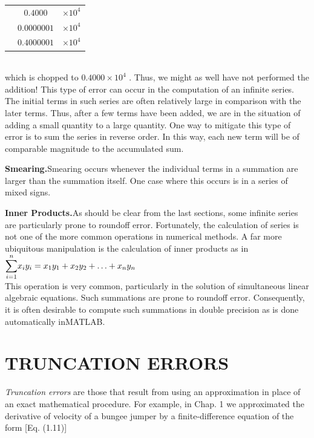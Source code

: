 \documentclass[../main.tex]{subfiles}
\begin{document}
\begin{tabular}{c c c}
    & $0.4000$ & $ \times 10^4$\\
    & $0.0000001$ & $ \times 10^4$\\
    \hline
    & $0.4000001$ & $ \times 10^4$\\
\end{tabular}\\

\noindent
which is chopped to $0.4000 \times 10^4$ . Thus, we might as well have not performed the addition!
This type of error can occur in the computation of an infinite series. The initial terms
in such series are often relatively large in comparison with the later terms. Thus, after a few
terms have been added, we are in the situation of adding a small quantity to a large quantity.
One way to mitigate this type of error is to sum the series in reverse order. In this way,
each new term will be of comparable magnitude to the accumulated sum.\\
\bigskip

\noindent
\textbf{Smearing.}\quad Smearing occurs whenever the individual terms in a summation are larger
than the summation itself. One case where this occurs is in a series of mixed signs.\\
\bigskip

\noindent
\textbf{Inner Products.}\quad As should be clear from the last sections, some infinite series are particularly
prone to roundoff error. Fortunately, the calculation of series is not one of the more
common operations in numerical methods. A far more ubiquitous manipulation is the calculation
of inner products as in\\

$\mathlarger{\sum}_{i=1}^{n}x_i y_i = x_1 y_1 + x_2 y_2 + \hdots + x_n y_n$\\

\noindent
This operation is very common, particularly in the solution of simultaneous linear algebraic
equations. Such summations are prone to roundoff error. Consequently, it is often desirable to
compute such summations in double precision as is done automatically inMATLAB.\\
\bigskip

\section[TRUNCATION ERRORS]{TRUNCATION ERRORS}
\noindent
\emph{Truncation errors} are those that result from using an approximation in place of an exact
mathematical procedure. For example, in Chap. 1 we approximated the derivative of velocity
of a bungee jumper by a finite-difference equation of the form [Eq. (1.11)]\\
\end{document}
